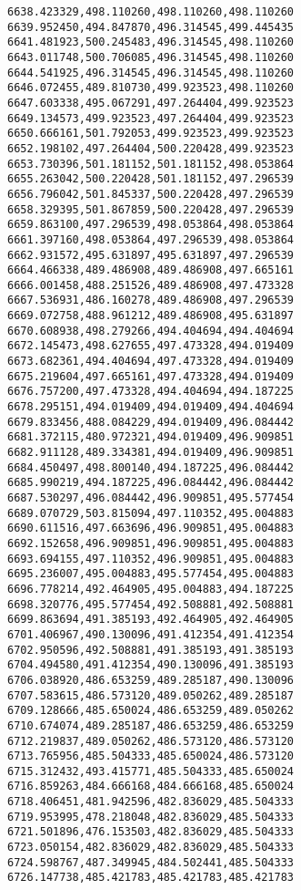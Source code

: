 \documentclass[11pt]{article}
\begin{document}
\begin{Verbatim}[commandchars=\\\{\}]
6638.423329,498.110260,498.110260,498.110260
6639.952450,494.847870,496.314545,499.445435
6641.481923,500.245483,496.314545,498.110260
6643.011748,500.706085,496.314545,498.110260
6644.541925,496.314545,496.314545,498.110260
6646.072455,489.810730,499.923523,498.110260
6647.603338,495.067291,497.264404,499.923523
6649.134573,499.923523,497.264404,499.923523
6650.666161,501.792053,499.923523,499.923523
6652.198102,497.264404,500.220428,499.923523
6653.730396,501.181152,501.181152,498.053864
6655.263042,500.220428,501.181152,497.296539
6656.796042,501.845337,500.220428,497.296539
6658.329395,501.867859,500.220428,497.296539
6659.863100,497.296539,498.053864,498.053864
6661.397160,498.053864,497.296539,498.053864
6662.931572,495.631897,495.631897,497.296539
6664.466338,489.486908,489.486908,497.665161
6666.001458,488.251526,489.486908,497.473328
6667.536931,486.160278,489.486908,497.296539
6669.072758,488.961212,489.486908,495.631897
6670.608938,498.279266,494.404694,494.404694
6672.145473,498.627655,497.473328,494.019409
6673.682361,494.404694,497.473328,494.019409
6675.219604,497.665161,497.473328,494.019409
6676.757200,497.473328,494.404694,494.187225
6678.295151,494.019409,494.019409,494.404694
6679.833456,488.084229,494.019409,496.084442
6681.372115,480.972321,494.019409,496.909851
6682.911128,489.334381,494.019409,496.909851
6684.450497,498.800140,494.187225,496.084442
6685.990219,494.187225,496.084442,496.084442
6687.530297,496.084442,496.909851,495.577454
6689.070729,503.815094,497.110352,495.004883
6690.611516,497.663696,496.909851,495.004883
6692.152658,496.909851,496.909851,495.004883
6693.694155,497.110352,496.909851,495.004883
6695.236007,495.004883,495.577454,495.004883
6696.778214,492.464905,495.004883,494.187225
6698.320776,495.577454,492.508881,492.508881
6699.863694,491.385193,492.464905,492.464905
6701.406967,490.130096,491.412354,491.412354
6702.950596,492.508881,491.385193,491.385193
6704.494580,491.412354,490.130096,491.385193
6706.038920,486.653259,489.285187,490.130096
6707.583615,486.573120,489.050262,489.285187
6709.128666,485.650024,486.653259,489.050262
6710.674074,489.285187,486.653259,486.653259
6712.219837,489.050262,486.573120,486.573120
6713.765956,485.504333,485.650024,486.573120
6715.312432,493.415771,485.504333,485.650024
6716.859263,484.666168,484.666168,485.650024
6718.406451,481.942596,482.836029,485.504333
6719.953995,478.218048,482.836029,485.504333
6721.501896,476.153503,482.836029,485.504333
6723.050154,482.836029,482.836029,485.504333
6724.598767,487.349945,484.502441,485.504333
6726.147738,485.421783,485.421783,485.421783

\end{Verbatim}
\end{document}
